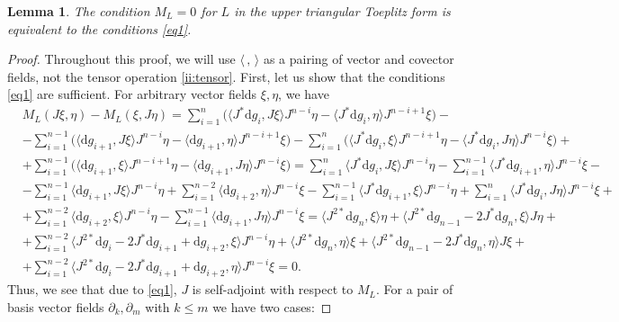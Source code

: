 \documentclass[12pt]{article}
\newtheorem{Lemma}{Lemma}[section]
\theoremstyle{remark}
\newcommand{\ddd}{\mathrm{d}}
\begin{document}
\begin{Lemma}\label{lm2}
The condition $M_L = 0$ for $L$ in the upper triangular Toeplitz form is equivalent to the conditions \eqref{eq1}.
\end{Lemma}
\begin{proof}
Throughout this proof, we will use $\langle \, , \,\rangle$ as a pairing of vector and covector fields, not the tensor operation \eqref{ii:tensor}. First, let us show that the conditions \eqref{eq1} are sufficient. For arbitrary vector fields $\xi, \eta$, we have
$$
\begin{aligned}
& M_L(J\xi, \eta) - M_L(\xi, J\eta) = \sum_{i = 1}^n \Big( \langle J^* \ddd g_i, J \xi \rangle J^{n - i} \eta  - \langle J^* \ddd g_i, \eta \rangle J^{n - i + 1} \xi\Big) - \\
& - \sum_{i = 1}^{n - 1} \Big( \langle \ddd g_{i + 1}, J \xi \rangle J^{n - i} \eta  - \langle \ddd g_{i + 1}, \eta \rangle J^{n - i + 1} \xi\Big) - \sum_{i = 1}^n \Big( \langle J^* \ddd g_i, \xi \rangle J^{n - i + 1} \eta  - \langle J^* \ddd g_i, J \eta \rangle J^{n - i} \xi\Big) + \\
& + \sum_{i = 1}^{n - 1} \Big( \langle \ddd g_{i + 1}, \xi \rangle J^{n - i + 1} \eta  - \langle \ddd g_{i + 1}, J \eta \rangle J^{n - i} \xi\Big) = \sum_{i = 1}^n \langle J^* \ddd g_i, J \xi \rangle J^{n - i} \eta - \sum_{i = 1}^{n - 1} \langle J^* \ddd g_{i + 1}, \eta \rangle J^{n - i} \xi - \\
& - \sum_{i = 1}^{n - 1} \langle \ddd g_{i + 1}, J \xi \rangle J^{n - i} \eta + \sum_{i = 1}^{n - 2} \langle \ddd g_{i + 2}, \eta \rangle J^{n - i} \xi - \sum_{i = 1}^{n - 1} \langle J^* \ddd g_{i + 1}, \xi \rangle J^{n - i} \eta  + \sum_{i = 1}^{n}\langle J^* \ddd g_i, J \eta \rangle J^{n - i} \xi + \\
& + \sum_{i = 1}^{n - 2} \langle \ddd g_{i + 2}, \xi \rangle J^{n - i} \eta  -\sum_{i = 1}^{n - 1} \langle \ddd g_{i + 1}, J \eta \rangle J^{n - i} \xi = \langle J^{2*} \ddd g_n, \xi \rangle \eta + \langle J^{2*} \ddd g_{n - 1} - 2 J^* \ddd g_n , \xi \rangle J \eta + \\
& + \sum_{i = 1}^{n - 2}\langle J^{2*} \ddd g_i - 2 J^* \ddd g_{i + 1} + \ddd g_{i + 2}, \xi \rangle J^{n - i}\eta + \langle J^{2*} \ddd g_n, \eta \rangle \xi + \langle J^{2*} \ddd g_{n - 1} - 2 J^* \ddd g_n , \eta \rangle J \xi + \\
& + \sum_{i = 1}^{n - 2}\langle J^{2*} \ddd g_i - 2 J^* \ddd g_{i + 1} + \ddd g_{i + 2}, \eta \rangle J^{n - i}\xi = 0.
\end{aligned} 
$$
Thus, we see that due to \eqref{eq1}, $J$ is self-adjoint with respect to $M_L$. For a pair of basis vector fields $\partial_k, \partial_m$ with $k \leq m$ we have two cases:

\end{proof}
\end{document}
